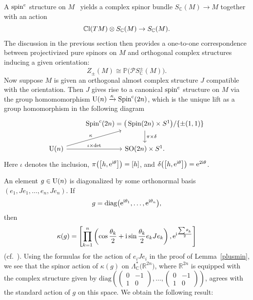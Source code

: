 \documentclass[pdftex]{sigma}%
\newcommand{\R}{\mathbb{R}}
\newcommand{\C}{\mathbb{C}}
\DeclareMathOperator{\Spin}{Spin}
\newcommand{\CCl}{\mathbb{C}{\rm l}}
\numberwithin{equation}{section}
\begin{document}
A ${\rm spin}^{\rm c}$ structure on $M$~\cite[Appendix~D]{LM} yields a complex spinor
bundle $S_\C(M)\to M$ together with an action
\[
\CCl(TM) \otimes S_\C(M) \to S_\C(M).
\]
The discussion in the previous section then provides a one-to-one correspondence between projectivized pure spinors on $M$ and orthogonal complex structures inducing a given orientation:
\[
Z_{\pm}(M) \cong \mathbb{P}\big( {\mathcal P}S _{\C}^{\pm}(M)\big).
\]
Now suppose $M$ is given an orthogonal almost complex structure $J$ compatible with the orientation. Then $J$ gives rise to a canonical ${\rm spin}^{\rm c}$ structure on $M$ via the group homomomorphism ${\rm U}(n) \xrightarrow{\kappa} \Spin^{\rm c}(2n)$, which is the unique
lift as a group homomorphism in the following diagram{\samepage
\[
\begin{tikzcd}
& \Spin^{\rm c}(2n) = \big(\Spin(2n) \times S^1\big)/\{\pm(1,1)\} \ar[d, "\pi \times \delta"] \\
{\rm U}(n) \ar[ur,"\kappa"] \ar[r,"\iota \times \det"] & {\rm SO}(2n) \times S^1.
\end{tikzcd}
\]
Here $\iota$ denotes the inclusion, $\pi\big(\big[h, {\rm e}^{{\rm i}\theta}\big]\big) = [h]$, and $\delta\big(\big[h,{\rm e}^{{\rm i}\theta}\big]\big)={\rm e}^{2{\rm i}\theta}$.}

An element $g\in {\rm U}(n)$ is diagonalized by some orthonormal basis $(e_1,Je_1, \ldots, e_n, Je_n)$. If
\[g=\mathrm{diag}\big({\rm e}^{{\rm i}\theta_1},\ldots, {\rm e}^{{\rm i}\theta_n}\big),\]
then
\[
\kappa(g)= \left[ \prod_{k=1}^n \left( \cos \frac{\theta_k} 2 + {\rm i} \sin \frac{\theta_k}{2} e_k J e_k\right), {\rm e}^{{\rm i} \frac{\sum \theta_k}{2}} \right]
\]
 (cf.~\cite[equation~(D.10)]{LM}). Using
the formulas for the action of $e_i Je_i$ in the proof of Lemma~\ref{plusmin}, we see that the spinor action of $\kappa(g)$
on $\Lambda^*_{\C}\big(\R^{2n}\big)$, where $\R^{2n}$ is equipped with the complex structure given by $\mathrm{diag}\left( \left(\begin{smallmatrix} 0 & -1 \\ 1 & 0 \end{smallmatrix}\right), \ldots, \left(\begin{smallmatrix} 0 & -1 \\ 1 & 0 \end{smallmatrix}\right) \right)$, agrees with the standard action of $g$ on this space. We obtain the following result:
\end{document}
